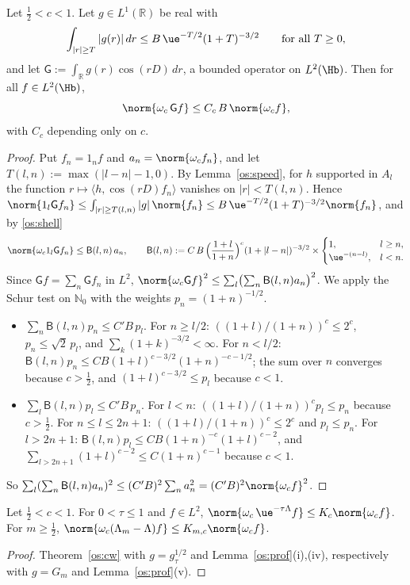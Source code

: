 \begin{theorem}\label{os:cw}
Let $\tfrac12<c<1$. Let $g\in L^1(\mathbb R)$ be real with
\[
\int_{|r|\ge T}|g(r)|\,dr\le B\,\ue^{-T/2}(1+T)^{-3/2}\qquad\text{for all }T\ge0,
\]
and let $\mathsf G:=\int_{\mathbb R}g(r)\cos(rD)\,dr$, a bounded operator on $L^2(\Hb)$. Then for all $f\in L^2(\Hb)$,
\[
\norm{\osomc\,\mathsf Gf}\le C_c\,B\,\norm{\osomc f},
\]
with $C_c$ depending only on $c$.
\end{theorem}
\begin{proof}
Put $f_n=1_nf$ and $a_n=\norm{\osomc f_n}$, and let $T(l,n):=\max(|l-n|-1,0)$. By Lemma~\ref{os:speed}, for $h$ supported in $A_l$ the function
$r\mapsto\langle h,\cos(rD)f_n\rangle$ vanishes on $|r|<T(l,n)$. Hence
$\norm{1_l\mathsf Gf_n}\le\int_{|r|\ge T(l,n)}|g|\,\norm{f_n}\le B\,\ue^{-T/2}(1+T)^{-3/2}\norm{f_n}$, and by \eqref{os:shell}
\[
\norm{\osomc1_l\mathsf Gf_n}\le\mathsf B(l,n)\,a_n,\qquad\mathsf B(l,n):=C\,B\,\Bigl(\frac{1+l}{1+n}\Bigr)^c(1+|l-n|)^{-3/2}\times
\begin{cases}1,&l\ge n,\\ \ue^{-(n-l)},&l<n.\end{cases}
\]
Since $\mathsf Gf=\sum_n\mathsf Gf_n$ in $L^2$, $\norm{\osomc\mathsf Gf}^2\le\sum_l\bigl(\sum_n\mathsf B(l,n)a_n\bigr)^2$. We apply the Schur test on
$\mathbb N_0$ with the weights $p_n=(1+n)^{-1/2}$.
\begin{itemize}
\item $\sum_n\mathsf B(l,n)p_n\le C'B\,p_l$. For $n\ge l/2$: $((1+l)/(1+n))^c\le2^c$, $p_n\le\sqrt2\,p_l$, and $\sum_k(1+k)^{-3/2}<\infty$. For $n<l/2$:
$\mathsf B(l,n)p_n\le CB(1+l)^{c-3/2}(1+n)^{-c-1/2}$; the sum over $n$ converges because $c>\tfrac12$, and $(1+l)^{c-3/2}\le p_l$ because $c<1$.
\item $\sum_l\mathsf B(l,n)p_l\le C'B\,p_n$. For $l<n$: $((1+l)/(1+n))^cp_l\le p_n$ because $c>\tfrac12$. For $n\le l\le2n+1$: $((1+l)/(1+n))^c\le2^c$ and
$p_l\le p_n$. For $l>2n+1$: $\mathsf B(l,n)p_l\le CB(1+n)^{-c}(1+l)^{c-2}$, and $\sum_{l>2n+1}(1+l)^{c-2}\le C(1+n)^{c-1}$ because $c<1$.
\end{itemize}
So $\sum_l(\sum_n\mathsf B(l,n)a_n)^2\le(C'B)^2\sum_na_n^2=(C'B)^2\norm{\osomc f}^2$.
\end{proof}

\begin{corollary}\label{os:cwp}
Let $\tfrac12<c<1$. For $0<\tau\le1$ and $f\in L^2$, $\norm{\osomc\,\ue^{-\tau\osLam}f}\le K_c\norm{\osomc f}$. For $m\ge\tfrac12$,
$\norm{\osomc(\Lambda_m-\osLam)f}\le K_{m,c}\norm{\osomc f}$.
\end{corollary}
\begin{proof}
Theorem~\ref{os:cw} with $g=g^{1/2}_\tau$ and Lemma~\ref{os:prof}(i),(iv), respectively with $g=G_m$ and Lemma~\ref{os:prof}(v).
\end{proof}

